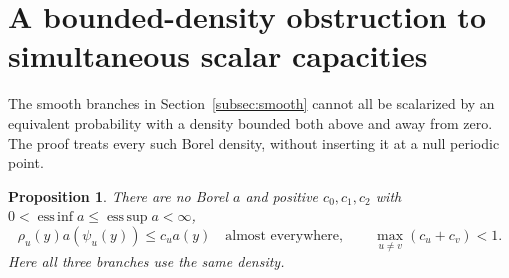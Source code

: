 \documentclass[11pt,reqno]{amsart}
\numberwithin{equation}{section}
\newtheorem{proposition}[theorem]{Proposition}
\theoremstyle{definition}
\begin{document}
\section{A bounded-density obstruction to simultaneous scalar capacities}
\label{app:measure}
The smooth branches in Section~\ref{subsec:smooth} cannot all be
scalarized by an equivalent probability with a density bounded both
above and away from zero. The proof treats every such Borel density,
without inserting it at a null periodic point.

\begin{proposition}\label{prop:bounded-density}
There are no Borel $a$ and positive $c_0,c_1,c_2$ with
$0<\operatorname*{ess\,inf}a\le\operatorname*{ess\,sup}a<\infty$,
\[
 \rho_u(y)a(\psi_u(y))\le c_u a(y)\quad\text{almost everywhere},
 \qquad\max_{u\ne v}(c_u+c_v)<1.
\]
Here all three branches use the same density.
\end{proposition}
\end{document}
